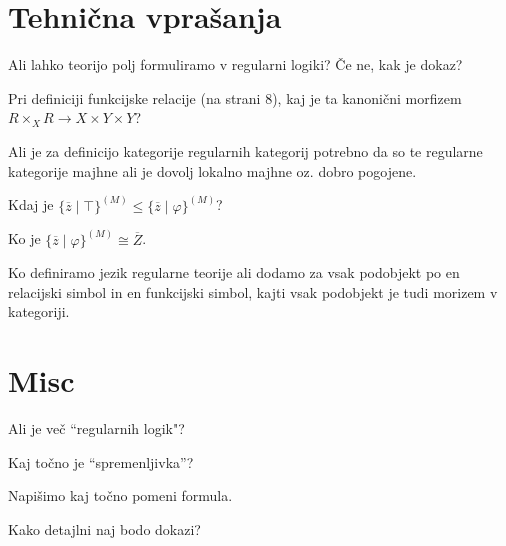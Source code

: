 \documentclass[12pt,a4paper]{article}
\newcommand\ans{\item[\textbf{A:}]}
\begin{document}
    \section*{Tehnična vprašanja}
    \begin{vprasanja}
        \item Ali lahko teorijo polj formuliramo v regularni logiki? Če ne, kak je dokaz?
        \ans
        \item Pri definiciji funkcijske relacije (na strani 8), kaj je ta kanonični morfizem $R \times_X R \to X \times Y \times Y$?
        \ans
        \item Ali je za definicijo kategorije regularnih kategorij potrebno da so te regularne kategorije majhne ali je dovolj lokalno majhne oz. dobro pogojene.
        \ans
        \item Kdaj je $\lbrace \overline{z} \mid \top \rbrace^{(M)} \leq \lbrace \overline{z} \mid \varphi \rbrace^{(M)}$?
        \ans Ko je $\lbrace \overline{z} \mid \varphi \rbrace^{(M)} \cong \overline{Z}$.
        \item Ko definiramo jezik regularne teorije ali dodamo za vsak podobjekt po en relacijski simbol in en funkcijski simbol,
            kajti vsak podobjekt je tudi morizem v kategoriji.
        \ans
    \end{vprasanja}

    \section*{Misc}
    \begin{vprasanja}
        \item Ali je več ``regularnih logik"?
        \ans
        \item Kaj točno je ``spremenljivka''?
        \ans
        \item Napišimo kaj točno pomeni formula.
        \ans
        \item Kako detajlni naj bodo dokazi?
        \ans
    \end{vprasanja}
\end{document}
